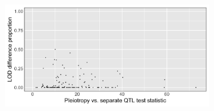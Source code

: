 \documentclass{article}
\begin{document}
\begin{figure}
\begin{subfigure}[t]{.38\textwidth}
\caption{}\label{fig:fig_k}
\end{subfigure}
\begin{subfigure}[t]{.38\textwidth}
\centering
\vspace{0pt}%
\includegraphics[width=\linewidth]{bar_12.jpg}
\caption{}\label{fig:fig_l}
\end{subfigure}

\end{figure}
\end{document}
